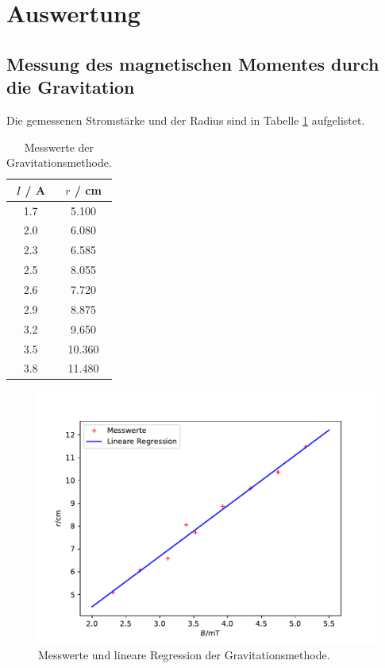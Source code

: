 \newpage

\section{Auswertung}

\subsection{Messung des magnetischen Momentes durch die Gravitation}
Die gemessenen Stromstärke und der Radius sind in Tabelle \ref{tab:1} aufgelistet.

\begin{table}
  \centering
  \caption{Messwerte der Gravitationsmethode.}
  \label{tab:1}
  \begin{tabular}{c c}
  \toprule
  $I$ / \si{\ampere} & $r$ / \si{\centi\meter} \\
  \midrule
  1.7 & 5.100 \\
  2.0 & 6.080 \\
  2.3 & 6.585 \\
  2.5 & 8.055 \\
  2.6 & 7.720 \\
  2.9 & 8.875 \\
  3.2 & 9.650 \\
  3.5 & 10.360 \\
  3.8 & 11.480 \\
  \bottomrule
  \end{tabular}
  \end{table}

  \begin{figure}[h]
    \centering
    \includegraphics[scale=0.7]{Gravmet.pdf}
    \caption{Messwerte und lineare Regression der Gravitationsmethode.}
    \label{Abb:1}
  \end{figure}

